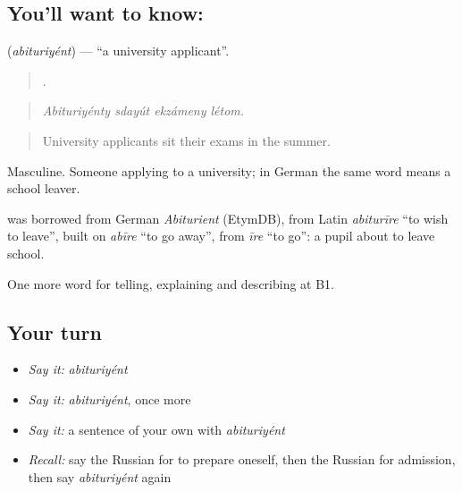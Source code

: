 \subsection*{You'll want to know: }
\textbf{} (\emph{abituriyént}) — \textquotedblleft{}a university applicant\textquotedblright{}.

\begin{quote}
   .
\end{quote}

\begin{quote}
\emph{Abituriyénty sdayút ekzámeny létom.}
\end{quote}

\begin{quote}
University applicants sit their exams in the summer.
\end{quote}

Masculine. Someone applying to a university; in German the same word means a school leaver.

\begin{cousinweb}
\textbf{} was borrowed from German \emph{Abiturient} (EtymDB), from Latin \emph{abiturīre} \textquotedblleft{}to wish to leave\textquotedblright{}, built on \emph{abīre} \textquotedblleft{}to go away\textquotedblright{}, from \emph{īre} \textquotedblleft{}to go\textquotedblright{}: a pupil about to leave school.
\end{cousinweb}

\begin{grammarlens}[title={What you've built}]
One more word for telling, explaining and describing at B1.
\end{grammarlens}

\subsection*{Your turn}
\begin{itemize}
\raggedright
  \item \emph{Say it:} \emph{abituriyént}
  \item \emph{Say it:} \emph{abituriyént}, once more
  \item \emph{Say it:} a sentence of your own with \emph{abituriyént}
  \item \emph{Recall:} say the Russian for to prepare oneself, then the Russian for admission, then say \emph{abituriyént} again
\end{itemize}

